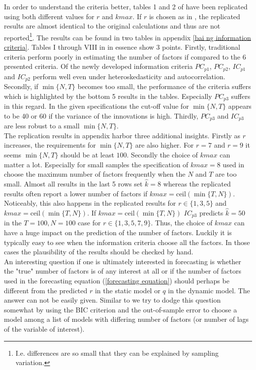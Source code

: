\documentclass[12pt]{article}
\begin{document}
In order to understand the criteria better, tables 1 and 2 of \citet{bai2002determining} have been replicated using both different values for $r$ and $kmax$. If $r$ is chosen as in \citet{bai2002determining}, the replicated results are almost identical to the original calculations and thus are not reported\footnote{I.e. differences are so small that they can be explained by sampling variation.}. The results can be found in two tables in appendix \ref{bai ng information criteria}. Tables I through VIII in \citet{bai2002determining} in essence show $3$ points. Firstly, traditional criteria perform poorly in estimating the number of factors if compared to the $6$ presented criteria. Of the newly developed information criteria $PC_{p1}$, $PC_{p2}$, $IC_{p1}$ and $IC_{p2}$ perform well even under heteroskedasticity and autocorrelation. Secondly, if $\min\{N, T\}$ becomes too small, the performance of the criteria suffers which is highlighted by the bottom 5 results in the tables. Especially $PC_{p3}$ suffers in this regard. In the given specifications the cut-off value for $\min\{N, T\}$ appears to be 40 or 60 if the variance of the innovations is high. Thirdly, $PC_{p3}$ and $IC_{p3}$ are less robust to a small $\min\{N, T\}$. \\
The replication results in appendix \citet{bai2002determining} harbor three additional insights. Firstly as $r$ increases, the requirements for $\min\{N, T\}$ are also higher. For $r=7$ and $r=9$ it seems $\min\{N, T\}$ should be at least $100$. Secondly the choice of $kmax$ can matter a lot. Especially for small samples the specification of $kmax=8$ used in \citet{bai2002determining} choose the maximum number of factors frequently when the $N$ and $T$ are too small. Almost all results in the last 5 rows set $\hat k=8$ whereas the replicated results often report a lower number of factors if $kmax=\text{ceil}(\min\{T, N\})$. Noticeably, this also happens in the replicated results for $r \in \{1, 3, 5\}$ and $kmax=\text{ceil}(\min\{T, N\})$. If $kmax=\text{ceil}(\min\{T, N\})$ $IC_{p3}$ predicts $\hat k=50$ in the $T=100, N=100$ case for $r \in \{1, 3, 5, 7, 9\}$. Thus, the choice of $kmax$ can have a huge impact on the prediction of the number of factors. Luckily it is typically easy to see when the information criteria choose all the factors. In those cases the plausibility of the results should be checked by hand. \\

An interesting question if one is ultimately interested in forecasting is whether the "true" number of factors is of any interest at all or if the number of factors used in the forecasting equation (\ref{forecasting equation}) should perhaps be different from the predicted $r$ in the static model or $q$ in the dynamic model. The answer can not be easily given. Similar to \citet{bai2008forecasting} we try to dodge this question somewhat by using the BIC criterion and the out-of-sample error to choose a model among a list of models with differing number of factors (or number of lags of the variable of interest).
\end{document}

